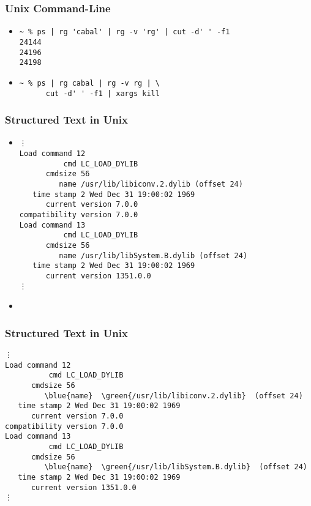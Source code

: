 \documentclass{beamer}
\begin{document}
\begin{frame}[fragile]
  \frametitle{Unix Command-Line}
  \begin{itemize}
      \item
        \begin{verbatim}
~ % ps | rg 'cabal' | rg -v 'rg' | cut -d' ' -f1
24144
24196
24198
        \end{verbatim}
      \item
        \begin{verbatim}
~ % ps | rg cabal | rg -v rg | \
      cut -d' ' -f1 | xargs kill
        \end{verbatim}
    \end{itemize}
\end{frame}

\begin{frame}[fragile]
  \frametitle{Structured Text in Unix}
  \begin{itemize}
  \item
    \begin{Verbatim}[fontsize=\footnotesize]
 % otool -l $(locate librure.dylib)
⋮
Load command 12
          cmd LC_LOAD_DYLIB
      cmdsize 56
         name /usr/lib/libiconv.2.dylib (offset 24)
   time stamp 2 Wed Dec 31 19:00:02 1969
      current version 7.0.0
compatibility version 7.0.0
Load command 13
          cmd LC_LOAD_DYLIB
      cmdsize 56
         name /usr/lib/libSystem.B.dylib (offset 24)
   time stamp 2 Wed Dec 31 19:00:02 1969
      current version 1351.0.0
⋮
    \end{Verbatim}
    \item\nil{}
\end{itemize}

\end{frame}

\begin{frame}[fragile]
  \frametitle{Structured Text in Unix}
    \begin{Verbatim}[commandchars=\\\{\}]
 % otool -l $(locate librure.dylib)
⋮
Load command 12
          cmd LC_LOAD_DYLIB
      cmdsize 56
         \blue{name}  \green{/usr/lib/libiconv.2.dylib}  (offset 24)
   time stamp 2 Wed Dec 31 19:00:02 1969
      current version 7.0.0
compatibility version 7.0.0
Load command 13
          cmd LC_LOAD_DYLIB
      cmdsize 56
         \blue{name}  \green{/usr/lib/libSystem.B.dylib}  (offset 24)
   time stamp 2 Wed Dec 31 19:00:02 1969
      current version 1351.0.0
⋮
    \end{Verbatim}
\end{frame}
\end{document}
